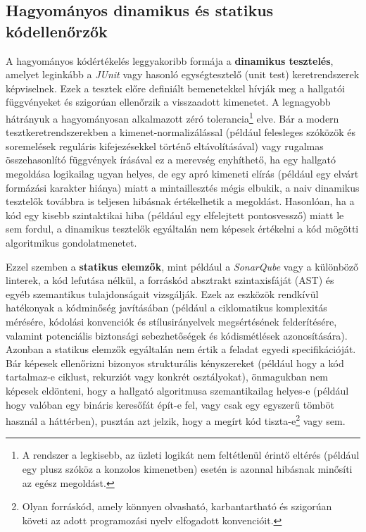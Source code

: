 \documentclass[12pt,a4paper]{article}
\begin{document}
\subsection{Hagyományos dinamikus és statikus kódellenőrzők}
A hagyományos kódértékelés leggyakoribb formája a \textbf{dinamikus tesztelés}, amelyet leginkább a \textit{JUnit} vagy hasonló egységtesztelő (unit test) keretrendszerek képviselnek. Ezek a tesztek előre definiált bemenetekkel hívják meg a hallgatói függvényeket és szigorúan ellenőrzik a visszaadott kimenetet. A legnagyobb hátrányuk a hagyományosan alkalmazott zéró tolerancia\footnote{A rendszer a legkisebb, az üzleti logikát nem feltétlenül érintő eltérés (például egy plusz szóköz a konzolos kimenetben) esetén is azonnal hibásnak minősíti az egész megoldást.} elve. Bár a modern tesztkeretrendszerekben a kimenet-normalizálással (például felesleges szóközök és soremelések reguláris kifejezésekkel történő eltávolításával) vagy rugalmas összehasonlító függvények írásával ez a merevség enyhíthető, ha egy hallgató megoldása logikailag ugyan helyes, de egy apró kimeneti elírás (például egy elvárt formázási karakter hiánya) miatt a mintaillesztés mégis elbukik, a naiv dinamikus tesztelők továbbra is teljesen hibásnak értékelhetik a megoldást. Hasonlóan, ha a kód egy kisebb szintaktikai hiba (például egy elfelejtett pontosvessző) miatt le sem fordul, a dinamikus tesztelők egyáltalán nem képesek értékelni a kód mögötti algoritmikus gondolatmenetet.

Ezzel szemben a \textbf{statikus elemzők}, mint például a \textit{SonarQube} vagy a különböző linterek, a kód lefutása nélkül, a forráskód absztrakt szintaxisfáját (AST) és egyéb szemantikus tulajdonságait vizsgálják. Ezek az eszközök rendkívül hatékonyak a kódminőség javításában (például a ciklomatikus komplexitás mérésére, kódolási konvenciók és stílusirányelvek megsértésének felderítésére, valamint potenciális biztonsági sebezhetőségek és kódismétlések azonosítására). Azonban a statikus elemzők egyáltalán nem értik a feladat egyedi specifikációját. Bár képesek ellenőrizni bizonyos strukturális kényszereket (például hogy a kód tartalmaz-e ciklust, rekurziót vagy konkrét osztályokat), önmagukban nem képesek eldönteni, hogy a hallgató algoritmusa szemantikailag helyes-e (például hogy valóban egy bináris keresőfát épít-e fel, vagy csak egy egyszerű tömböt használ a háttérben), pusztán azt jelzik, hogy a megírt kód tiszta-e\footnote{Olyan forráskód, amely könnyen olvasható, karbantartható és szigorúan követi az adott programozási nyelv elfogadott konvencióit.} vagy sem.
\end{document}
